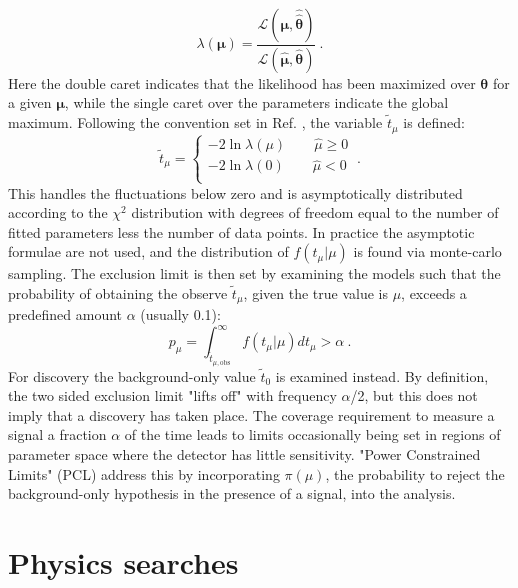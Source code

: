 \begin{equation}
    \lambda(\boldsymbol{\mu}) = \frac{\mathcal{L}(\boldsymbol{\mu},  \hat {\hat {\boldsymbol \theta}})}{\mathcal{L}(\hat {\boldsymbol \mu},  \hat  {\boldsymbol {\theta}})}
    \label{eq:plr}~.
\end{equation}
\noindent
Here the double caret indicates that the likelihood has been maximized over $\boldsymbol{\theta}$ for a given $\boldsymbol{\mu}$, while the single caret over the parameters indicate the global maximum.
Following the convention set in Ref. \cite{baxter_recommended_2021}, the variable $\tilde t_\mu$ is defined: 
\begin{equation}
    \tilde t_\mu =
    \begin{cases}
    -2 \ln \lambda(\mu) \qquad \hat \mu \geq 0 \\
     -2 \ln \lambda(0) \qquad \hat \mu < 0 \\
    \end{cases}~.
\end{equation}
\noindent
This handles the fluctuations below zero and is asymptotically distributed according to the $\chi^2$ distribution with degrees of freedom equal to the number of fitted parameters less the number of data points\cite{wilks_large-sample_1938}.
In practice the asymptotic formulae are not used, and the distribution of $f(t_\mu|\mu)$ is found via monte-carlo sampling.
The exclusion limit is then set by examining the models such that the probability of obtaining the observe $\tilde t_\mu$, given the true value is $\mu$, exceeds a predefined amount $\alpha$ (usually 0.1):
\begin{equation}
    p_\mu = \int_{\tilde t_{\mu, \text {obs}}}^\infty  f(t_\mu | \mu) dt_\mu > \alpha~.
\end{equation}
\noindent
For discovery the background-only value $\tilde t_0$ is examined instead.
By definition, the two sided exclusion limit "lifts off" with frequency $\alpha$/2, but this does not imply that a discovery has taken place. 
The coverage requirement to measure a signal a fraction $\alpha$ of the time leads to limits occasionally being set in regions of parameter space where the detector has little sensitivity.
"Power Constrained Limits" (PCL) address this by incorporating $\pi(\mu)$, the probability to reject the background-only hypothesis in the presence of a signal, into the analysis\cite{cowan_power-constrained_2011}.

\section{Physics searches}
